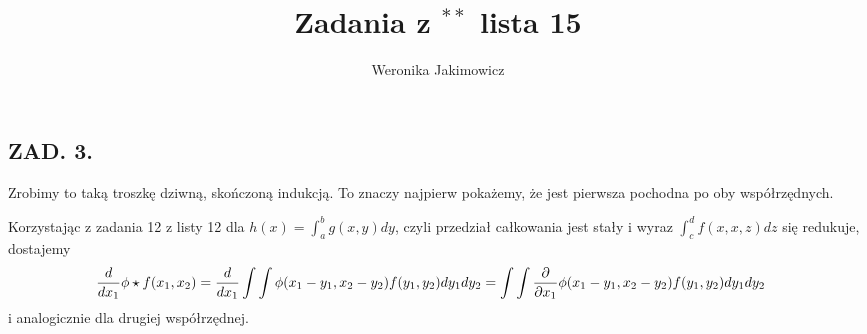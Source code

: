 \documentclass{article}
\title{Zadania z $^{**}$ lista 15}
\author{Weronika Jakimowicz}
\begin{document}
\maketitle
\thispagestyle{empty}

\subsection*{ZAD. 3.}

Zrobimy to taką troszkę dziwną, skończoną indukcją. To znaczy najpierw pokażemy, że jest pierwsza pochodna po oby współrzędnych. 


Korzystając z zadania 12 z listy 12 dla $h(x)=\int_a^bg(x,y)dy$, czyli przedział całkowania jest stały i wyraz $\int_c^df(x,x,z)dz$ się redukuje, dostajemy
\begin{align*}
    {d\over dx_1}\phi\star f(x_1,x_2)&={d\over dx_1}\int\int \phi(x_1-y_1,x_2-y_2)f(y_1,y_2)dy_1dy_2=\int\int{\partial\over\partial x_1}\phi(x_1-y_1,x_2-y_2)f(y_1,y_2)dy_1dy_2
\end{align*}
i analogicznie dla drugiej współrzędnej.
\medskip
\end{document}

